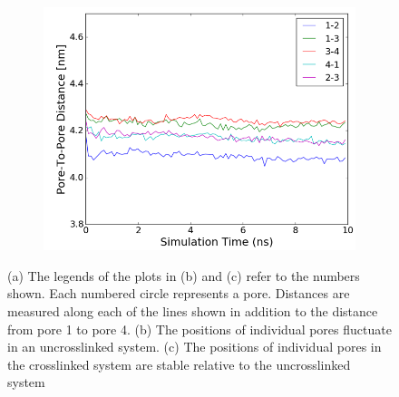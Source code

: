\documentclass{article}
\begin{document}
\begin{figure}[H]
\begin{subfigure}{0.31\textwidth}
		\centering
		\includegraphics[width=\textwidth]{xlink_p2p.png}
		\caption{}\label{fig:xlink_p2p}
	\end{subfigure}
	\caption{(a) The legends of the plots in (b) and (c) refer to the numbers shown.
	Each numbered circle represents a pore. Distances are measured along each of the 
	lines shown in addition to the distance from pore 1 to pore 4. (b) The positions
	of individual pores fluctuate in an uncrosslinked system. (c) The positions of
	individual pores in the crosslinked system are stable relative to the uncrosslinked
	system}\label{fig:xlink}
  \end{figure}
\end{document}
